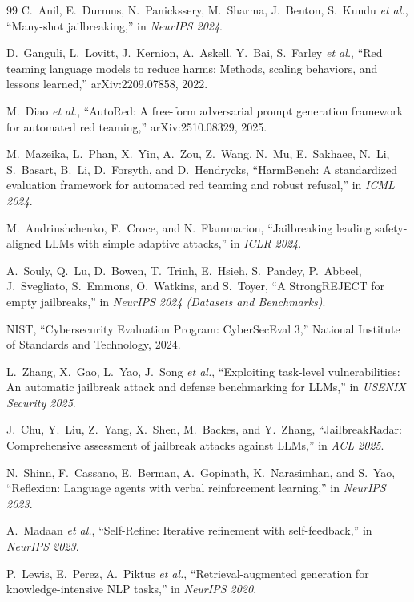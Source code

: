 \begin{thebibliography}{99}
 C.~Anil, E.~Durmus, N.~Panickssery, M.~Sharma, J.~Benton, S.~Kundu \textit{et al.}, ``Many-shot jailbreaking,'' in \textit{NeurIPS 2024}.

 D.~Ganguli, L.~Lovitt, J.~Kernion, A.~Askell, Y.~Bai, S.~Farley \textit{et al.}, ``Red teaming language models to reduce harms: Methods, scaling behaviors, and lessons learned,'' arXiv:2209.07858, 2022.

 M.~Diao \textit{et al.}, ``AutoRed: A free-form adversarial prompt generation framework for automated red teaming,'' arXiv:2510.08329, 2025.

 M.~Mazeika, L.~Phan, X.~Yin, A.~Zou, Z.~Wang, N.~Mu, E.~Sakhaee, N.~Li, S.~Basart, B.~Li, D.~Forsyth, and D.~Hendrycks, ``HarmBench: A standardized evaluation framework for automated red teaming and robust refusal,'' in \textit{ICML 2024}.

 M.~Andriushchenko, F.~Croce, and N.~Flammarion, ``Jailbreaking leading safety-aligned LLMs with simple adaptive attacks,'' in \textit{ICLR 2024}.

 A.~Souly, Q.~Lu, D.~Bowen, T.~Trinh, E.~Hsieh, S.~Pandey, P.~Abbeel, J.~Svegliato, S.~Emmons, O.~Watkins, and S.~Toyer, ``A StrongREJECT for empty jailbreaks,'' in \textit{NeurIPS 2024 (Datasets and Benchmarks)}.

 NIST, ``Cybersecurity Evaluation Program: CyberSecEval 3,'' National Institute of Standards and Technology, 2024.

 L.~Zhang, X.~Gao, L.~Yao, J.~Song \textit{et al.}, ``Exploiting task-level vulnerabilities: An automatic jailbreak attack and defense benchmarking for LLMs,'' in \textit{USENIX Security 2025}.

 J.~Chu, Y.~Liu, Z.~Yang, X.~Shen, M.~Backes, and Y.~Zhang, ``JailbreakRadar: Comprehensive assessment of jailbreak attacks against LLMs,'' in \textit{ACL 2025}.

 N.~Shinn, F.~Cassano, E.~Berman, A.~Gopinath, K.~Narasimhan, and S.~Yao, ``Reflexion: Language agents with verbal reinforcement learning,'' in \textit{NeurIPS 2023}.

 A.~Madaan \textit{et al.}, ``Self-Refine: Iterative refinement with self-feedback,'' in \textit{NeurIPS 2023}.

 P.~Lewis, E.~Perez, A.~Piktus \textit{et al.}, ``Retrieval-augmented generation for knowledge-intensive NLP tasks,'' in \textit{NeurIPS 2020}.


\end{thebibliography}
